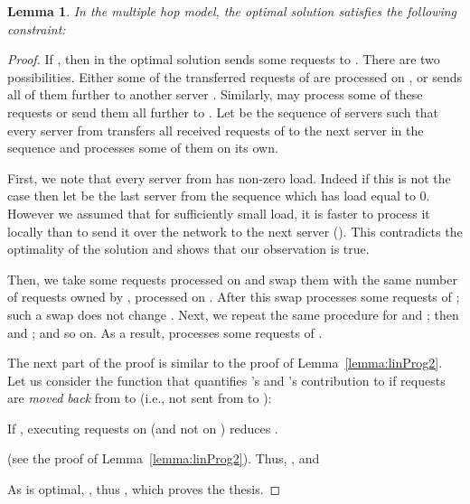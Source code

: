 \documentclass[11pt]{article}
\newtheorem{lemma}[theorem]{Lemma}
\begin{document}
\begin{lemma}\label{lemma:linProg3}
In the multiple hop model, the optimal solution  satisfies the following constraint:

\end{lemma}
\begin{proof}
If , then in the optimal solution  sends some requests to . There are two possibilities. Either some of the transferred requests of  are processed on , or  sends all of them further to another server . Similarly,  may process some of these requests or send them all further to . Let  be the sequence of servers such that every server from  transfers all received requests of  to the next server in the sequence and  processes some of them on its own.

First, we note that every server from  has non-zero load. Indeed if this is not the case then let  be the last server from the sequence which has load equal to 0. However we assumed that for sufficiently small load, it is faster to process it locally than to send it over the network to the next server  (). This contradicts the optimality of the solution and shows that our observation is true.

Then, we take some requests processed on  and swap them with the same number of requests owned by , processed on . After this swap  processes some requests of ; such a swap does not change . Next, we repeat the same procedure for  and ; then  and ; and so on. As a result,  processes some requests of .

The next part of the proof is similar to the proof of Lemma~\ref{lemma:linProg2}. Let us consider the function  that quantifies 's and 's contribution to  if  requests are \emph{moved back} from  to  (i.e., not sent from  to ):

If , executing  requests on  (and not on ) reduces .

 (see the proof of Lemma~\ref{lemma:linProg2}).
Thus, , and

As  is optimal, , thus , which proves the thesis.
\end{proof}
\end{document}
